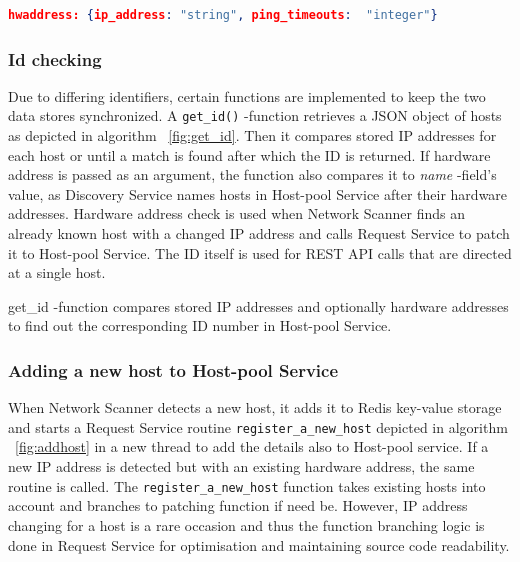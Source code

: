 \begin{lstlisting}[language=json,firstnumber=1, caption={Discovery Service data format for a single host}, captionpos=b, label=lst:discoformat]
hwaddress: {ip_address: "string", ping_timeouts:  "integer"}
\end{lstlisting}

\subsubsection{Id checking}

Due to differing identifiers, certain functions are implemented to keep the two data stores synchronized. A \verb|get_id()| -function retrieves a JSON object of hosts as depicted in algorithm ~\ref{fig:get_id}. Then it compares stored IP addresses for each host or until a match is found after which the ID is returned. If hardware address is passed as an argument, the function also compares it to \emph{name} -field's value, as Discovery Service names hosts in Host-pool Service after their hardware addresses. Hardware address check is used when Network Scanner finds an already known host with a changed IP address and calls Request Service to patch it to Host-pool Service. The ID itself is used for REST API calls that are directed at a single host.

\begin{algorithm}[H]
\label{fig:get_id}
\begin{center}
\end{center}
\;
\caption{get\_id -function compares stored IP addresses and optionally hardware addresses to find out the corresponding ID number in Host-pool Service.}
\end{algorithm}

\subsubsection{Adding a new host to Host-pool Service} \label{addtohostpool}

When Network Scanner detects a new host, it adds it to Redis key-value storage and starts a Request Service routine \verb|register_a_new_host| depicted in algorithm ~\ref{fig:addhost} in
a new thread to add the details also to Host-pool service. If a new IP address is detected but with an existing hardware address, the same routine is called. The \verb|register_a_new_host| function takes existing hosts into account and branches to patching function if need be. However, IP address changing for a host is a rare occasion and thus the function branching logic is done in Request Service for optimisation and maintaining source code readability.

